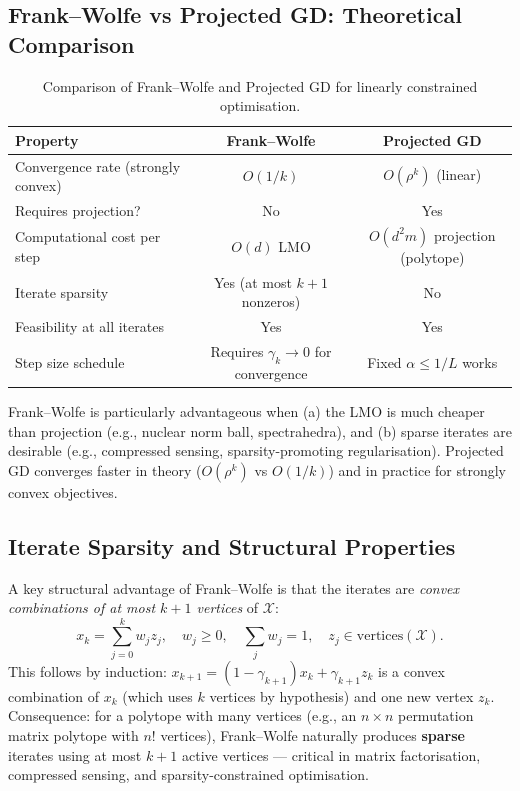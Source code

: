 \documentclass[11pt,a4paper]{article}
\theoremstyle{definition}
\begin{document}
\subsection{Frank--Wolfe vs Projected GD: Theoretical Comparison}

\begin{table}[H]
\centering
\caption{Comparison of Frank--Wolfe and Projected GD for linearly constrained optimisation.}
\label{tab:fw_vs_pgd}
\begin{tabular}{lcc}
\toprule
\textbf{Property} & \textbf{Frank--Wolfe} & \textbf{Projected GD} \\
\midrule
Convergence rate (strongly convex) & $O(1/k)$ & $O(\rho^k)$ (linear) \\
Requires projection? & No & Yes \\
Computational cost per step & $O(d)$ LMO & $O(d^2 m)$ projection (polytope) \\
Iterate sparsity & Yes (at most $k+1$ nonzeros) & No \\
Feasibility at all iterates & Yes & Yes \\
Step size schedule & Requires $\gamma_k \to 0$ for convergence & Fixed $\alpha \leq 1/L$ works \\
\bottomrule
\end{tabular}
\end{table}

Frank--Wolfe is particularly advantageous when (a) the LMO is much cheaper than projection (e.g., nuclear norm ball, spectrahedra), and (b) sparse iterates are desirable (e.g., compressed sensing, sparsity-promoting regularisation). Projected GD converges faster in theory ($O(\rho^k)$ vs $O(1/k)$) and in practice for strongly convex objectives.

\subsection{Iterate Sparsity and Structural Properties}

A key structural advantage of Frank--Wolfe is that the iterates are \emph{convex combinations of at most $k+1$ vertices} of $\mathcal{X}$:
\begin{equation}
x_k = \sum_{j=0}^{k} w_j z_j, \quad w_j \geq 0, \quad \sum_j w_j = 1, \quad z_j \in \text{vertices}(\mathcal{X}).
\end{equation}
This follows by induction: $x_{k+1} = (1-\gamma_{k+1}) x_k + \gamma_{k+1} z_k$ is a convex combination of $x_k$ (which uses $k$ vertices by hypothesis) and one new vertex $z_k$. Consequence: for a polytope with many vertices (e.g., an $n \times n$ permutation matrix polytope with $n!$ vertices), Frank--Wolfe naturally produces \textbf{sparse} iterates using at most $k+1$ active vertices --- critical in matrix factorisation, compressed sensing, and sparsity-constrained optimisation.
\end{document}
